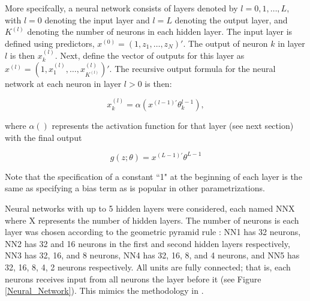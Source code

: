 \documentclass[a4paper, table]{article}
\begin{document}
More specifcally, a neural network consists of layers denoted by $l = 0, 1, \dots, L$, with $l = 0$ denoting the input layer and $l = L$ denoting the output layer, and $K^{(l)}$ denoting the number of neurons in each hidden layer. The input layer is defined using predictors, $x^{(0)} = (1, z_1, \dots, z_N)'$. The output of neuron $k$ in layer $l$ is then $x_k^{(l)}$. Next, define the vector of outputs for this layer as $x^{(l)} = (1, x_1^{(l)}, \dots, x_{K^(l)}^{(l)})'$.  The recursive output formula for the neural network at each neuron in layer $l > 0$ is then:

\begin{equation}
x_k^{(l)} = \alpha(x^{(l-1)'}\theta_k^{l-1}),
\end{equation}

where $\alpha()$ represents the activation function for that layer (see next section) with the final output

\begin{equation}
g(z;\theta) = x^{(L-1)'}\theta^{L-1}
\end{equation}

Note that the specification of a constant ``1" at the beginning of each layer is the same as specifying a bias term as is popular in other parametrizations. 

Neural networks with up to 5 hidden layers were considered, each named NNX where X represents the number of hidden layers. The number of neurons is each layer was chosen according to the geometric pyramid rule \citep{masters_practical_1993}: NN1 has 32 neurons, NN2 has 32 and 16 neurons in the first and second hidden layers respectively, NN3 has 32, 16, and 8 neurons, NN4 has 32, 16, 8, and 4 neurons, and NN5 has 32, 16, 8, 4, 2 neurons respectively. All units are fully connected; that is, each neurons receives input from all neurons the layer before it (see Figure \ref{Neural_Network}). This mimics the methodology in \cite{gu_empirical_2018}.
\end{document}
